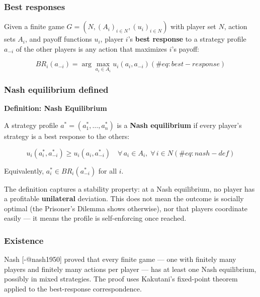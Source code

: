 \documentclass[
]{article}
\begin{document}
\subsubsection{Best responses}\label{best-responses}

Given a finite game \(G = (N, (A_i)_{i \in N}, (u_i)_{i \in N})\) with
player set \(N\), action sets \(A_i\), and payoff functions \(u_i\),
player \(i\)'s \textbf{best response} to a strategy profile \(a_{-i}\)
of the other players is any action that maximizes \(i\)'s payoff:

\begin{equation}
BR_i(a_{-i}) = \arg\max_{a_i \in A_i} u_i(a_i, a_{-i})
(\#eq:best-response)
\end{equation}

\subsubsection{Nash equilibrium defined}\label{nash-equilibrium-defined}

\textbf{Definition: Nash Equilibrium}

A strategy profile \(a^* = (a_1^*, \ldots, a_n^*)\) is a \textbf{Nash
equilibrium} if every player's strategy is a best response to the
others:

\begin{equation}
u_i(a_i^*, a_{-i}^*) \geq u_i(a_i, a_{-i}^*) \quad \forall\, a_i \in A_i, \; \forall\, i \in N
(\#eq:nash-def)
\end{equation}

Equivalently, \(a_i^* \in BR_i(a_{-i}^*)\) for all \(i\).

The definition captures a stability property: at a Nash equilibrium, no
player has a profitable \textbf{unilateral} deviation. This does not
mean the outcome is socially optimal (the Prisoner's Dilemma shows
otherwise), nor that players coordinate easily --- it means the profile
is self-enforcing once reached.

\subsubsection{Existence}\label{existence}

Nash {[}-@nash1950{]} proved that every finite game --- one with
finitely many players and finitely many actions per player --- has at
least one Nash equilibrium, possibly in mixed strategies. The proof uses
Kakutani's fixed-point theorem applied to the best-response
correspondence.
\end{document}
